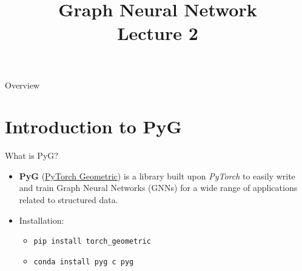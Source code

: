 \documentclass{beamer}
\title[] %
{Graph Neural Network \\Lecture 2}
\date[] %
\begin{document}
\begin{frame}
    \titlepage
\end{frame}

\begin{frame}{Overview}
    \tableofcontents
\end{frame}

\section{Introduction to PyG}

\begin{frame}{What is PyG?}

    \begin{itemize}
        \item \textbf{PyG} (\href{https://github.com/pyg-team/pytorch_geometric}{PyTorch Geometric}) is a library built upon \textit{PyTorch} to easily write and train Graph Neural Networks (GNNs) for a wide range of applications related to structured data.
        \vspace{0.5cm}
        \item Installation:
         	\begin{itemize}
			\item \texttt{pip install torch\_geometric}
			\item  \texttt{conda install pyg \-c pyg}
		\end{itemize}
    \end{itemize}
   
\end{frame}






\end{document}
